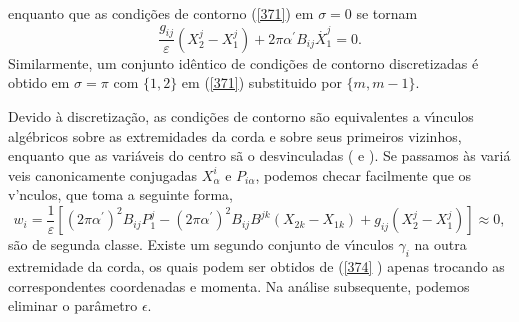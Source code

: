 \documentclass[a4paper,thmsa,12pt]{report}
\begin{document}
enquanto que as condi\c{c}\~{o}es de contorno (\ref{371}) em $\sigma =0$ se
tornam 
\begin{equation}
\frac{g_{ij}}{\varepsilon }\left( X_{2}^{j}-X_{1}^{j}\right) +2\pi \alpha
^{\prime }B_{ij}\stackrel{.}{X}_{1}^{j}=0.  \label{373}
\end{equation}
Similarmente, um conjunto id\^{e}ntico de condi\c{c}\~{o}es de contorno
discretizadas \'{e} obtido em $\sigma =\pi $ com $\{1,2\}$ em (\ref{371})
substituido por $\{m,m-1\}$.

Devido \`{a} discretiza\c{c}\~{a}o, as condi\c{c}\~{o}es de contorno s\~{a}o
equivalentes a v\'{\i}nculos alg\'{e}bricos sobre as extremidades da corda e
sobre seus primeiros vizinhos, enquanto que as vari\'{a}veis do centro s\~{a}%
o desvinculadas (\cite{ardalan1} e \cite{kim}). Se passamos \`{a}s vari\'{a}%
veis canonicamente conjugadas $X_{\alpha }^{i}$ e $P_{i\alpha }$, podemos
checar facilmente que os v'nculos, que toma a seguinte forma, 
\begin{equation}
w_{i}=\frac{1}{\varepsilon }\left[ \left( 2\pi \alpha ^{\prime }\right)
^{2}B_{ij}P_{1}^{j}-\left( 2\pi \alpha ^{\prime }\right)
^{2}B_{ij}B^{jk}\left( X_{2k}-X_{1k}\right) +g_{ij}\left(
X_{2}^{j}-X_{1}^{j}\right) \right] \approx 0,  \label{374}
\end{equation}
s\~{a}o de segunda classe. Existe um segundo conjunto de v\'{\i}nculos $\gamma
_{i}$ na outra extremidade da corda, os quais podem ser obtidos de (\ref{374}%
) apenas trocando as correspondentes coordenadas e momenta. Na an\'{a}lise
subsequente, podemos eliminar o par\^{a}metro $\epsilon $.
\end{document}
